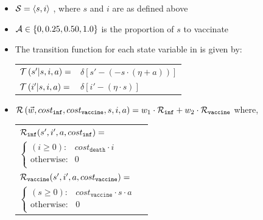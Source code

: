 \begin{itemize}
    \item {\footnotesize $ \mathcal{S} = \left\langle s, i \right\rangle$ }, where $ s $ and $ i $ are as defined above
    \item {\footnotesize $ \mathcal{A} \in \left\lbrace 0, 0.25, 0.50, 1.0 \right\rbrace $} is the proportion of $ s $ to vaccinate
    \item The transition function {\footnotesize \Transition} for each state variable in {\footnotesize \State} is given by:    \\
    {\footnotesize 
        \abovedisplayskip=5pt
        \belowdisplayskip=0pt
        \renewcommand{\arraystretch}{1.5}
        \begin{tabular}{ll}
            $ \mathcal{T}\left( s' | s, i, a \right) =$ & $ \delta \left[ s' - (- s \cdot (\eta + a)) \right] $ \\
            $ \mathcal{T}\left( i' | s, i, a \right) =$ & $ \delta \left[ i' - (\eta \cdot s) \right] $ \\
        \end{tabular}
    }%
    \item {\footnotesize $ \mathcal{R}\left(\vec{w}, cost_{\mathtt{inf}}, cost_{\mathtt{vaccine}}, s, i, a \right) = w_1 \cdot \mathcal{R}_{\mathtt{inf}} + w_2 \cdot \mathcal{R}_{\mathtt{vaccine}}$} where, \\
    {\footnotesize 
        \abovedisplayskip=10pt
        \belowdisplayskip=0pt
        \renewcommand{\arraystretch}{1.5}
        \begin{tabular}{ll}    
            $ \mathcal{R}_{\mathtt{inf}}(s', i', a, cost_{\mathtt{inf}}) = $ &  $ $ \\
                \qquad $ \begin{cases}
                (i \geq 0) : & cost_{\mathtt{death}} \cdot i \\
                \text{otherwise} : & 0 \\
                \end{cases} $ & $ $ \\
            $ \mathcal{R}_{\mathtt{vaccine}}(s', i', a, cost_{\mathtt{vaccine}}) = $ &  $ $ \\
                \qquad $ \begin{cases}
                (s \geq 0) : & cost_{\mathtt{vaccine}} \cdot s \cdot a \\
                \text{otherwise} : & 0 \\
                \end{cases} $ & $ $ \\
        \end{tabular}
    }    
\end{itemize} 

